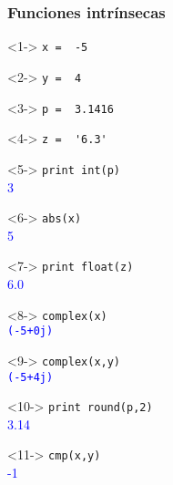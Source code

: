 \documentclass[12pt]{beamer}
\begin{document}
\begin{frame}[fragile]
\frametitle{Funciones intr\'{i}nsecas}
\fontsize{12}{12}\selectfont
\begin{minipage}{5.5cm}
\begin{exampleblock}{}<1->
	\verb|x =  -5|
\end{exampleblock}
\begin{exampleblock}{}<2->
	\verb|y =  4|
\end{exampleblock}
\begin{exampleblock}{}<3->
	\verb|p =  3.1416|
\end{exampleblock}
\begin{exampleblock}{}<4->
	\verb|z =  '6.3'|
\end{exampleblock}
\begin{exampleblock}{}<5->
	\verb|print int(p)| \\
	\pause
	\textcolor{blue}{3}
\end{exampleblock}
\begin{exampleblock}{}<6->
	\verb|abs(x)| \\
	\pause
	\textcolor{blue}{5}
\end{exampleblock}
\end{minipage}
\hspace{0.5cm}
\begin{minipage}{5.5cm}
\begin{exampleblock}{}<7->
	\verb|print float(z)| \\
	\pause
	\textcolor{blue}{6.0}
\end{exampleblock}
\begin{exampleblock}{}<8->
	\verb|complex(x)| \\
	\pause
	\textcolor{blue}{\texttt{(-5+0j)}}
\end{exampleblock}
\begin{exampleblock}{}<9->
	\verb|complex(x,y)| \\
	\pause
	\textcolor{blue}{\texttt{(-5+4j)}}
\end{exampleblock}
\begin{exampleblock}{}<10->
	\verb|print round(p,2)| \\
	\pause
	\textcolor{blue}{3.14}
\end{exampleblock}
\begin{exampleblock}{}<11->
	\verb|cmp(x,y)| \\
	\pause
	\textcolor{blue}{-1}
\end{exampleblock}
\end{minipage}
\end{frame}
\end{document}
